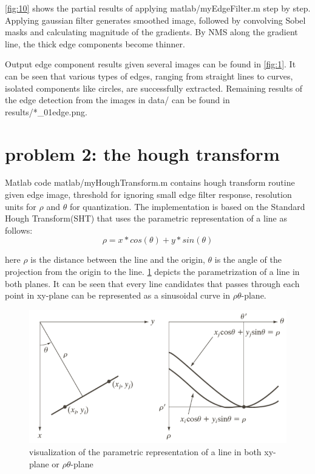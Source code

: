 \documentclass[extendedabs]{bmvc2k}
\begin{document}
\figurename{\ref{fig:10}} shows the partial results of applying matlab/myEdgeFilter.m step by step.
Applying gaussian filter generates smoothed image, followed by convolving Sobel masks and calculating magnitude of
the gradients. By NMS along the gradient line, the thick edge components become thinner.

Output edge component results given several images can be found in \figurename{\ref{fig:1}}.
It can be seen that various types of edges, ranging from straight lines to curves, isolated components like circles,
are successfully extracted. Remaining results of the edge detection from the images in data/ can be found in
results/*\_01edge.png. 

\section*{problem 2: the hough transform}

Matlab code matlab/myHoughTransform.m contains hough transform routine given edge image, threshold for ignoring small edge
filter response, resolution units for $\rho$ and $\theta$ for quantization. The implementation is based on the
Standard Hough Transform(SHT) that uses the parametric representation of a line as follows:
\[\rho = x * cos(\theta) + y*sin(\theta)\]

here $\rho$ is the distance between the line and the origin, $\theta$ is the angle of the projection from the origin to the line. 
\figurename{\ref{fig:3}} depicts the parametrization of a line in both planes. It can be seen that every line candidates that 
passes through each point in xy-plane can be represented as a sinusoidal curve in $\rho\theta$-plane.  

\begin{figure}[h]
    \centering
    \includegraphics[width=\linewidth]{hw4_2_1}
    \caption{visualization of the parametric representation of a line in both xy-plane or $\rho\theta$-plane}
    \label{fig:3}
\end{figure}
\end{document}
